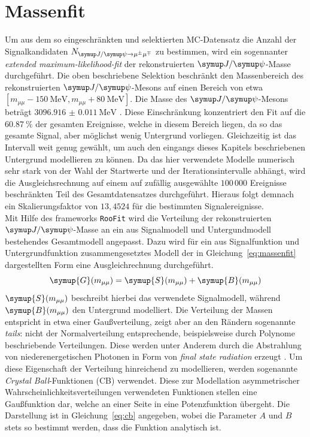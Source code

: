 \section{Massenfit}
\label{sec:massenfit}
Um aus dem so eingeschränkten und selektierten MC-Datensatz die Anzahl der Signalkandidaten $N_{\kontroll}$ zu bestimmen, wird ein sogennanter \textit{extended maximum-likelihood-fit} \cite{extended} der rekonstruierten $\jpsi$-Masse durchgeführt. Die oben
beschriebene Selektion beschränkt den Massenbereich des rekonstruierten $\jpsi$-Mesons auf einen Bereich von etwa
$[m_{\mu\mu}-\SI{150}{\mega\electronvolt}, m_{\mu\mu}+\SI{80}{\mega\electronvolt}]$. Die Masse des $\jpsi$-Mesons beträgt $\SI{3096.916(11)}{\mega\electronvolt}$ \cite{pdg}. Diese Einschränkung konzentriert den Fit auf die $\SI{60.87}{\percent}$ der gesamten Ereignisse, welche in diesem Bereich liegen, da so das gesamte Signal, aber möglichst wenig Untergrund vorliegen. Gleichzeitig ist das Intervall weit genug gewählt, um auch den eingangs dieses Kapitels beschriebenen Untergrund modellieren zu können. Da das hier verwendete Modelle numerisch sehr stark von der Wahl der Startwerte und der Iterationsintervalle abhängt, wird die Ausgleichsrechnung auf einem auf zufällig ausgewählte $100\,000$ Ereignisse beschränkten Teil des Gesamtdatensatzes durchgeführt. Hieraus folgt demnach ein Skalierungsfaktor von $13,4524$ für die bestimmten Signalereignisse. \\
%
Mit Hilfe des frameworks \texttt{RooFit} \cite{roofit} wird die Verteilung der rekonstruierten $\jpsi$-Masse an ein aus Signalmodell und Untergundmodell bestehendes Gesamtmodell angepasst. Dazu wird für ein aus Signalfunktion und Untergrundfunktion zusammengesetztes Modell der in Gleichung~\ref{eq:massenfit} dargestellten Form eine Ausgleichrechnung durchgeführt.
%
\begin{equation}
  \symup{G}(m_{\mu\mu})= \symup{S}(m_{\mu\mu}) + \symup{B}(m_{\mu\mu})
  \label{eq:massenfit}
\end{equation}
%
$\symup{S}(m_{\mu\mu})$ beschreibt hierbei das verwendete Signalmodell, während $\symup{B}(m_{\mu\mu})$ den Untergrund modelliert. Die Verteilung der Massen entspricht in etwa einer Gaußverteilung, zeigt aber an den Rändern sogenannte \textit{tails}: nicht der Normalverteilung entsprechende, beispielsweise durch Polynome beschriebende Verteilungen. Diese werden unter Anderem durch die Abstrahlung von niederenergetischen Photonen in Form von \textit{final state radiation} erzeugt \cite{cb}. Um diese Eigenschaft der Verteilung hinreichend zu modellieren, werden sogenannte \textit{Crystal Ball}-Funktionen (CB) verwendet. Diese zur Modellation asymmetrischer Wahrscheinlichkeitsverteilungen verwendeten Funktionen stellen eine Gaußfunktion dar, welche an einer Seite in eine Potenzfunktion übergeht. Die Darstellung ist in Gleichung~\ref{eq:cb} \cite{cb} angegeben, wobei die Parameter $A$ und $B$ stets so bestimmt werden, dass die Funktion analytisch ist.
